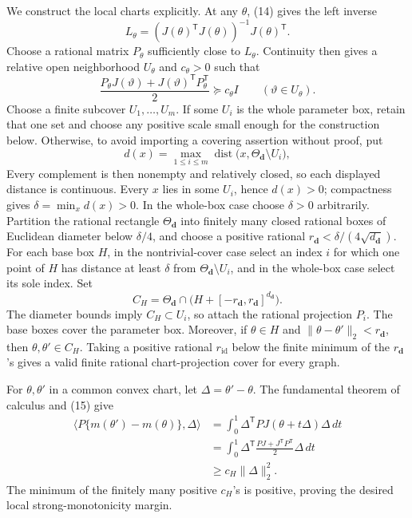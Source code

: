 We construct the local charts explicitly.  At any \(\theta\), (14) gives the left inverse
\[
 L_\theta=(J(\theta)^{\mathsf T}J(\theta))^{-1}J(\theta)^{\mathsf T}.
\]
Choose a rational matrix \(P_\theta\) sufficiently close to \(L_\theta\).  Continuity then gives a relative open neighborhood \(U_\theta\) and \(c_\theta>0\) such that
\[
 \frac{P_\theta J(\vartheta)+J(\vartheta)^{\mathsf T}P_\theta^{\mathsf T}}2
 \succeq c_\theta I
 \qquad(\vartheta\in U_\theta). \tag{15}
\]
Choose a finite subcover \(U_1,\ldots,U_m\).  If some \(U_i\) is the whole parameter box, retain that one set and choose any positive scale small enough for the construction below.  Otherwise, to avoid importing a covering assertion without proof, put
\[
 d(x)=\max_{1\leq i\leq m}
 \operatorname{dist}\bigl(x,\Theta_{\boldsymbol d}\setminus U_i\bigr),
\]
Every complement is then nonempty and relatively closed, so each displayed distance is continuous.  Every \(x\) lies in some \(U_i\), hence \(d(x)>0\); compactness gives \(\delta=\min_xd(x)>0\).  In the whole-box case choose \(\delta>0\) arbitrarily.  Partition the rational rectangle \(\Theta_{\boldsymbol d}\) into finitely many closed rational boxes of Euclidean diameter below \(\delta/4\), and choose a positive rational \(r_{\boldsymbol d}<\delta/(4\sqrt{d_{\boldsymbol d}})\).  For each base box \(H\), in the nontrivial-cover case select an index \(i\) for which one point of \(H\) has distance at least \(\delta\) from \(\Theta_{\boldsymbol d}\setminus U_i\), and in the whole-box case select its sole index.  Set
\[
 C_H=\Theta_{\boldsymbol d}\cap
 \bigl(H+[-r_{\boldsymbol d},r_{\boldsymbol d}]^{d_{\boldsymbol d}}\bigr).
\]
The diameter bounds imply \(C_H\subset U_i\), so attach the rational projection \(P_i\).  The base boxes cover the parameter box.  Moreover, if \(\theta\in H\) and \(\|\theta-\theta'\|_2<r_{\boldsymbol d}\), then \(\theta,\theta'\in C_H\).  Taking a positive rational \(r_{\mathrm{id}}\) below the finite minimum of the \(r_{\boldsymbol d}\)'s gives a valid finite rational chart-projection cover for every graph.

For \(\theta,\theta'\) in a common convex chart, let \(\Delta=\theta'-\theta\).  The fundamental theorem of calculus and (15) give
\[
\begin{aligned}
 \langle P\{m(\theta')-m(\theta)\},\Delta\rangle
 &=\int_0^1\Delta^{\mathsf T}PJ(\theta+t\Delta)\Delta\,dt\\
 &=\int_0^1\Delta^{\mathsf T}
 \frac{PJ+J^{\mathsf T}P^{\mathsf T}}2
 \Delta\,dt\\
 &\geq c_H\|\Delta\|_2^2.
\end{aligned} \tag{16}
\]
The minimum of the finitely many positive \(c_H\)'s is positive, proving the desired local strong-monotonicity margin.

